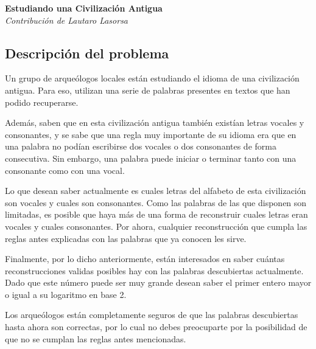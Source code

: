 \documentclass[fontsize=13pt, paper=a4, DIV=calc]{scrartcl}
\renewcommand*{\maketitle}{
	\begin{center}
		\textbf{\nombre}\\
		\textit{\footnotesize Contribución de \author}
	\end{center}
}
\begin{document}
\def\contest{OIA Certamen Nacional}
\def\nombre{Estudiando una Civilización Antigua}
\def\author{Lautaro Lasorsa}
\def\niveldia{}
\def\numero{}
\def\archivo{civilización}%
\def\version{}


\maketitle
\begin{multicols*}{2}

\section{Descripción del problema}

Un grupo de arqueólogos locales están estudiando el idioma de una civilización antigua. Para eso, utilizan una serie de palabras presentes en textos que han podido recuperarse.

Además, saben que en esta civilización antigua también existían letras vocales y consonantes, y se sabe que una regla muy importante de su idioma era que en una palabra no podían escribirse dos vocales o dos consonantes de forma consecutiva. Sin embargo, una palabra puede iniciar o terminar tanto con una consonante como con una vocal.

Lo que desean saber actualmente es cuales letras del alfabeto de esta civilización son vocales y cuales son consonantes. Como las palabras de las que disponen son limitadas, es posible que haya más de una forma de reconstruir cuales letras eran vocales y cuales consonantes. Por ahora, cualquier reconstrucción que cumpla las reglas antes explicadas con las palabras que ya conocen les sirve.

Finalmente, por lo dicho anteriormente, están interesados en saber cuántas reconstrucciones validas posibles hay con las palabras descubiertas actualmente. Dado que este número puede ser muy grande desean saber el primer entero mayor o igual a su logaritmo en base 2. 

Los arqueólogos están completamente seguros de que las palabras descubiertas hasta ahora son correctas, por lo cual no debes preocuparte por la posibilidad de que no se cumplan las reglas antes mencionadas.
 

\end{multicols*}
\end{document}
